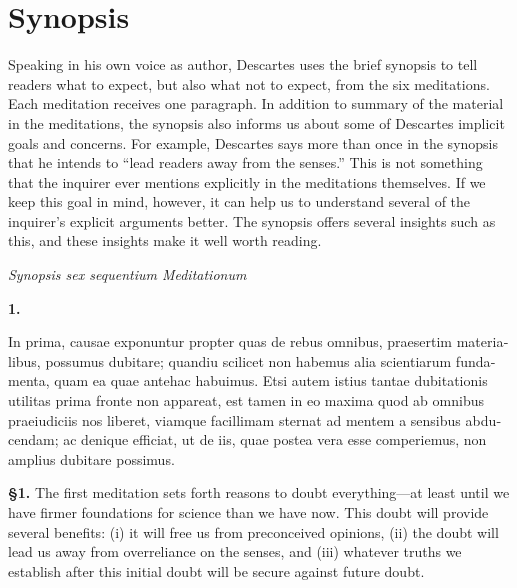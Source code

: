 \chapter{Synopsis}


Speaking in his own voice as author, Descartes uses the brief synopsis to tell readers what to expect, but also what not to expect, from the six meditations. Each meditation receives one paragraph. In addition to summary of the material in the meditations, the synopsis also informs us about some of Descartes implicit goals and concerns. For example, Descartes says more than once in the synopsis that he intends to ``lead readers away from the senses.'' This is not something that the inquirer ever mentions explicitly in the meditations themselves. If we keep this goal in mind, however, it can help us to understand several of the inquirer's explicit arguments better. The synopsis offers several insights such as this, and these insights make it well worth reading.
\clearpage

\begin{center}
    \beginnumbering
    \numberlinefalse
    \pstart
    \textit{Synopsis sex sequentium Meditationum}
    \pend
    \endnumbering
\end{center}

\beginnumbering
\pstart
\textbf{1.} \begin{latin}In prima, causae exponuntur propter quas de rebus omnibus, praesertim materialibus, possumus dubitare; quandiu scilicet non habemus alia scientiarum fundamenta, quam ea quae antehac habuimus. Etsi autem istius tantae dubitationis utilitas prima fronte non appareat, est tamen in eo maxima quod ab omnibus praeiudiciis nos liberet, viamque facillimam sternat ad mentem a sensibus abducendam; ac denique efficiat, ut de iis, quae postea vera esse comperiemus, non amplius dubitare possimus.\end{latin}
\pend
\endnumbering

\prenotes

\textbf{§1.} The first meditation sets forth reasons to doubt everything---at least until we have firmer foundations for science than we have now. This doubt will provide several benefits: (i) it will free us from preconceived opinions, (ii) the doubt will lead us away from overreliance on the senses, and (iii) whatever truths we establish after this initial doubt will be secure against future doubt.

